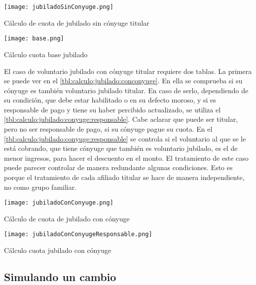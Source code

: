 \begin{table*}
    \centering
    \texttt{[image: jubiladoSinConyuge.png]}
    \caption{Cálculo de cuota de jubilado sin cónyuge titular}
    \label{tbl:calculo:jubilado:sinconyuge}
\end{table*}

\begin{table*}
    \centering
    \texttt{[image: base.png]}
    \caption{Cálculo cuota base jubilado}
    \label{tbl:calculo:jubilado:base}
\end{table*}

El caso de voluntario jubilado con cónyuge titular requiere dos tablas. 
La primera se puede ver en el \cref{tbl:calculo:jubilado:conconyuge}.
En ella se comprueba si su cónyuge es también voluntario jubilado titular.
En caso de serlo, dependiendo de su condición, que debe estar habilitado o en su defecto moroso, y si es responsable de pago y tiene su haber percibido actualizado, se utiliza el \cref{tbl:calculo:jubilado:conyuge:responsable}.
Cabe aclarar que puede ser titular, pero no ser responsable de pago, si su cónyuge pague su cuota. 
En el \cref{tbl:calculo:jubilado:conyuge:responsable} se controla si el voluntario al que se le está cobrando, que tiene cónyuge que también es voluntario jubilado, es el de menor ingresos, para hacer el descuento en el monto.
El tratamiento de este caso puede parecer controlar de manera redundante algunas condiciones. 
Esto es porque el tratamiento de cada afiliado titular se hace de manera independiente, no como grupo familiar.

\begin{table*}
    \centering
    \texttt{[image: jubiladoConConyuge.png]}
    \caption{Cálculo de cuota de jubilado con cónyuge}
    \label{tbl:calculo:jubilado:conconyuge}
\end{table*}

\begin{table*}
    \centering
    \texttt{[image: jubiladoConConyugeResponsable.png]}
    \caption{Cálculo cuota jubilado con cónyuge}
    \label{tbl:calculo:jubilado:conyuge:responsable}
\end{table*}

\subsection{Simulando un cambio}
\label{ssec:integracion:cambio}

